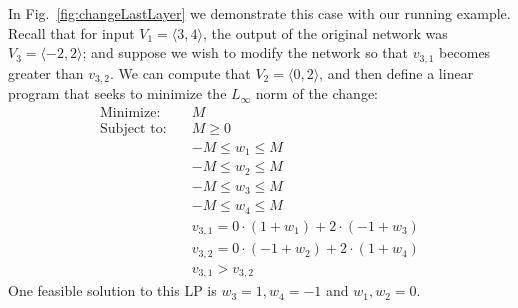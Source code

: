 \documentclass{easychair}
\newcommand{\guy}[1]{\marginpar{\textcolor{orange}{Guy: #1}}}
\newcommand{\ben}[1]{\marginpar{\textcolor{blue}{Ben: #1}}}
\begin{document}
In Fig.~\ref{fig:changeLastLayer} we demonstrate this case with our running example.
Recall that for input $V_1=\langle 3,4\rangle$, the output of the
original network  was $V_3=\langle -2,2 \rangle$; and suppose we wish
to modify the network so that $v_{3,1}$ becomes greater than $v_{3,2}$.
We can compute that $V_2=\langle 0,2\rangle$, and then define a linear
program that seeks to minimize the $L_\infty$ norm of the change:
\begin{align*}
\text{Minimize}:\quad & M \\
  \text{Subject to}:\quad &M\geq 0\\
& -M \leq w_1\leq M \\
& -M \leq w_2\leq M \\
& -M \leq w_3\leq M \\
& -M \leq w_4\leq M \\
& v_{3,1}=0\cdot(1+w_1)+2\cdot(-1+w_3)\\
& v_{3,2}=0\cdot(-1+w_2)+2\cdot(1+w_4)\\
& v_{3,1} > v_{3,2}
\end{align*}
One feasible solution to this LP is $w_3=1,w_4=-1$ and $w_1,w_2=0$.
\guy{Is this the optimal solution?}
\ben{I'm pretty sure it is optimal for both norms}
\end{document}
